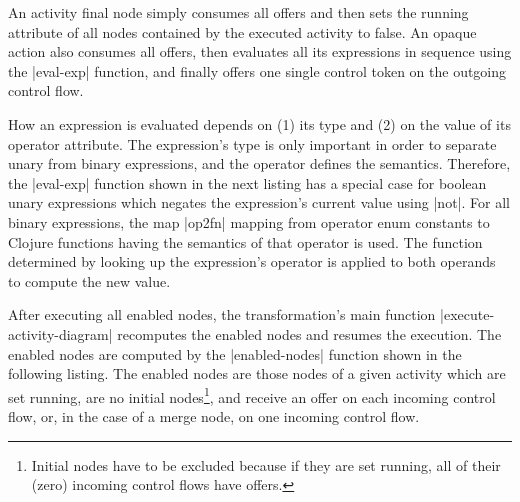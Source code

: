 \documentclass[submission]{eptcs}
\newcommand{\code}{\clojureinline}
\begin{document}
An activity final node simply consumes all offers and then sets the
\textsf{running} attribute of all nodes contained by the executed activity to
false.  An opaque action also consumes all offers, then evaluates all its
expressions in sequence using the \code|eval-exp| function, and finally offers
one single control token on the outgoing control flow.

How an expression is evaluated depends on (1) its type and (2) on the value of
its \textsf{operator} attribute.  The expression's type is only important in
order to separate unary from binary expressions, and the operator defines the
semantics.  Therefore, the \code|eval-exp| function shown in the next listing
has a special case for boolean unary expressions which negates the expression's
current value using \code|not|.  For all binary expressions, the map
\code|op2fn| mapping from operator enum constants to Clojure functions having
the semantics of that operator is used.  The function determined by looking up
the expression's operator is applied to both operands to compute the new value.


After executing all enabled nodes, the transformation's main function
\code|execute-activity-diagram| recomputes the enabled nodes and resumes the
execution.  The enabled nodes are computed by the \code|enabled-nodes| function
shown in the following listing.  The enabled nodes are those nodes of a given
activity which are set running, are no initial nodes\footnote{Initial nodes
  have to be excluded because if they are set running, all of their (zero)
  incoming control flows have offers.}, and receive an offer on each incoming
control flow, or, in the case of a merge node, on one incoming control flow.
\end{document}
